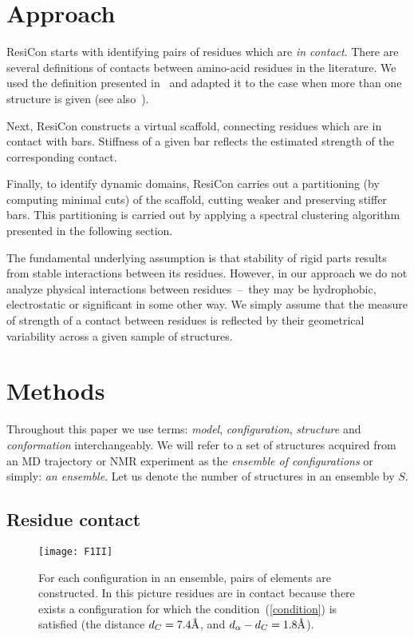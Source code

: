 \documentclass[a4paper,11pt,twoside]{book}%
\begin{document}
\section{Approach} 
ResiCon starts with identifying pairs of residues which are \emph{in contact}.
There are several definitions of contacts between amino-acid residues in the literature.
We used the definition presented in~\cite{daniluk2011novel} and adapted it to the case when more than one structure is given (see also~\cite{daniluk2014theoretical}).

Next, ResiCon constructs a virtual scaffold, connecting residues which are in contact with bars.
Stiffness of a given bar reflects the estimated strength of the corresponding contact. 

Finally, to identify dynamic domains, ResiCon carries out a partitioning (by computing minimal cuts) of the scaffold, cutting weaker and preserving stiffer bars.
This partitioning is carried out by applying a spectral clustering algorithm presented in the following section.

The fundamental underlying assumption is that stability of rigid parts results from stable interactions between its residues.
However, in our approach we do not analyze physical interactions between residues~--~they may be hydrophobic, electrostatic or significant in some other way.
We simply assume that the measure of strength of a contact between residues is reflected by their geometrical variability across a given sample of structures.

\section{Methods}
Throughout this paper we use terms: \emph{model}, \emph{configuration}, \emph{structure} and \emph{conformation} interchangeably.
We will refer to a set of structures acquired from an MD trajectory or NMR experiment as the \emph{ensemble of configurations} or simply: \emph{an ensemble}.
Let us denote the number of structures in an ensemble by $S$.

\subsection*{Residue contact}
\begin{figure}
\centering
\texttt{[image: F1II]}
\caption{
For each configuration in an ensemble, pairs of elements are constructed.
In this picture residues are in contact because there exists a configuration for which the condition~(\ref{condition}) is satisfied (the distance $d_C=7.4\mbox{\normalfont\AA}$, and $d_\alpha-d_C = 1.8\mbox{\normalfont\AA}$).
}
\label{contact}
\end{figure}
\end{document}
